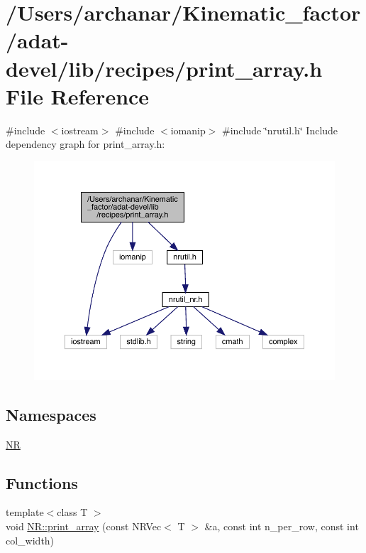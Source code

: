 \hypertarget{adat-devel_2lib_2recipes_2print__array_8h}{}\section{/\+Users/archanar/\+Kinematic\+\_\+factor/adat-\/devel/lib/recipes/print\+\_\+array.h File Reference}
\label{adat-devel_2lib_2recipes_2print__array_8h}
{\ttfamily \#include $<$iostream$>$}\newline
{\ttfamily \#include $<$iomanip$>$}\newline
{\ttfamily \#include \char`\"{}nrutil.\+h\char`\"{}}\newline
Include dependency graph for print\+\_\+array.\+h\+:
\nopagebreak
\begin{figure}[H]
\begin{center}
\leavevmode
\includegraphics[width=350pt]{d2/de9/adat-devel_2lib_2recipes_2print__array_8h__incl}
\end{center}
\end{figure}
\subsection*{Namespaces}
\begin{DoxyCompactItemize}
\item 
 \mbox{\hyperlink{namespaceNR}{NR}}
\end{DoxyCompactItemize}
\subsection*{Functions}
\begin{DoxyCompactItemize}
\item 
{\footnotesize template$<$class T $>$ }\\void \mbox{\hyperlink{namespaceNR_abdbf6d4f445b801d09e550474f942b00}{N\+R\+::print\+\_\+array}} (const N\+R\+Vec$<$ T $>$ \&a, const int n\+\_\+per\+\_\+row, const int col\+\_\+width)
\end{DoxyCompactItemize}
